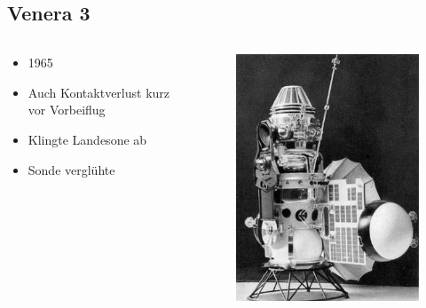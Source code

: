 \documentclass{beamer}
\begin{document}
	\subsection{Venera 3}
	\begin{frame}
		\begin{columns}
			\begin{column}{0.5\textwidth}
				\begin{itemize}
					\item 1965
					\item Auch Kontaktverlust kurz vor Vorbeiflug
					\item Klingte Landesone ab
					\item Sonde verglühte
				\end{itemize}
			\end{column}
			\begin{column}{0.4\textwidth}
				\begin{figure}[ht]
					\includegraphics[scale=0.4]{./images/venera_3}
				\end{figure}
			\end{column}
		\end{columns}
	\end{frame}
\end{document}
